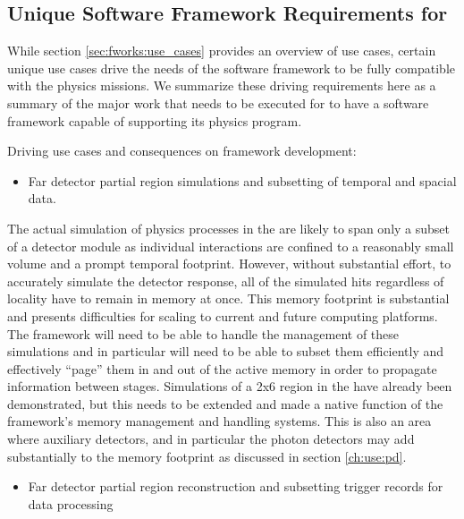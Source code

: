 \documentclass[../main-v1.tex]{subfiles}
\begin{document}
\subsection{Unique Software Framework Requirements for }
\label{sec:fworks:urgent}

While section \ref{sec:fworks:use_cases} provides an overview of use cases, certain unique use cases drive the needs of the  software framework to be fully compatible with the physics missions.   We summarize these driving requirements here as a summary of the major work that needs to be executed for  to have a software framework capable of supporting its physics program.


Driving use cases and consequences on framework development:


\begin{itemize}
\item Far detector partial region simulations and subsetting of temporal and spacial data.
\end{itemize}

The actual simulation of physics processes in the  are likely to span only a subset of a detector module as individual interactions are confined to a reasonably small volume and a prompt temporal footprint.  However, without substantial effort, to accurately simulate the detector response, all of the simulated hits regardless of locality have to remain in memory at once.  This memory footprint is substantial and presents difficulties for scaling to current and future computing platforms.  The framework will need to be able to handle the management of these simulations and in particular will need to be able to subset them efficiently and effectively ``page'' them in and out of the active memory in order to propagate information between stages.  Simulations of a 2x6  region in the  have already been demonstrated, but this needs to be extended and made a native function of the framework's memory management and handling systems.  This is also an area where auxiliary detectors, and in particular the photon detectors may add substantially to the memory footprint as discussed in section \ref{ch:use:pd}. 


\begin{itemize}
\item Far detector partial region reconstruction and subsetting trigger records for data processing
\end{itemize}
\end{document}
